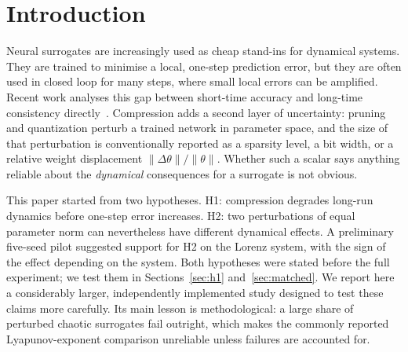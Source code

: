 \documentclass[11pt]{article}
\newcommand{\relnorm}{\|\Delta\theta\|/\|\theta\|}
\begin{document}
\section{Introduction}
Neural surrogates are increasingly used as cheap stand-ins for dynamical systems. They are trained to minimise a local, one-step prediction error, but they are often used in closed loop for many steps, where small local errors can be amplified. Recent work analyses this gap between short-time accuracy and long-time consistency directly~\cite{liu2026sns,robertson2026,biswas2026}. Compression adds a second layer of uncertainty: pruning and quantization perturb a trained network in parameter space, and the size of that perturbation is conventionally reported as a sparsity level, a bit width, or a relative weight displacement $\relnorm$. Whether such a scalar says anything reliable about the \emph{dynamical} consequences for a surrogate is not obvious.

This paper started from two hypotheses. H1: compression degrades long-run dynamics before one-step error increases. H2: two perturbations of equal parameter norm can nevertheless have different dynamical effects. A preliminary five-seed pilot suggested support for H2 on the Lorenz system, with the sign of the effect depending on the system. Both hypotheses were stated before the full experiment; we test them in Sections~\ref{sec:h1} and~\ref{sec:matched}. We report here a considerably larger, independently implemented study designed to test these claims more carefully. Its main lesson is methodological: a large share of perturbed chaotic surrogates fail outright, which makes the commonly reported Lyapunov-exponent comparison unreliable unless failures are accounted for.
\end{document}
